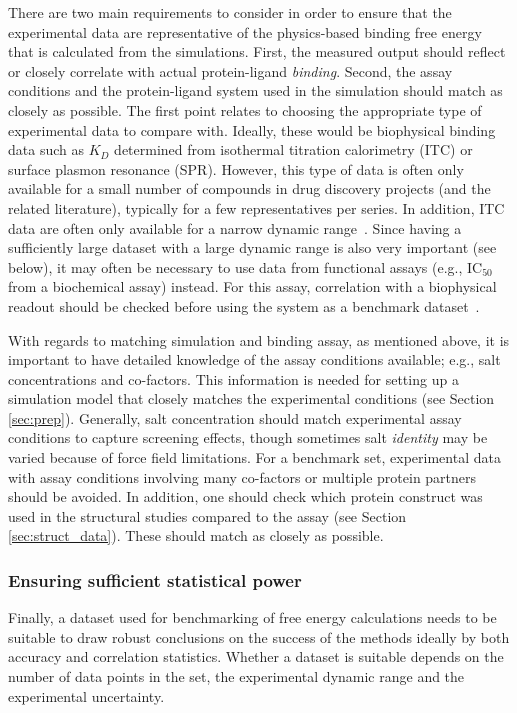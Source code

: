\documentclass[9pt,bestpractices,pubversion]{livecoms}
\begin{document}
There are two main requirements to consider in order to ensure that the experimental data are representative of the physics-based binding free energy that is calculated from the simulations. First, the measured output should reflect or closely correlate with actual protein-ligand \emph{binding}. Second, the assay conditions and the protein-ligand system used in the simulation should match as closely as possible. The first point relates to choosing the appropriate type of experimental data to compare with. Ideally, these would be biophysical binding data such as $K_D$ determined from isothermal titration calorimetry (ITC) or surface plasmon resonance (SPR). However, this type of data is often only available for a small number of compounds in drug discovery projects (and the related literature), typically for a few representatives per series. In addition, ITC data are often only available for a narrow dynamic range~\cite{wiseman_rapid_1989,chodera_entropyenthalpy_2013}. Since having a sufficiently large dataset with a large dynamic range is also very important (see below), it may often be necessary to use data from functional assays (e.g., IC$_{50}$ from a biochemical assay) instead. For this assay, correlation with a biophysical readout should be checked before using the system as a benchmark dataset~\cite{kalliokoski_comparability_2013}.

With regards to matching simulation and binding assay, as mentioned above, it is important to have detailed knowledge of the assay conditions available; e.g., salt concentrations and co-factors. This information is needed for setting up a simulation model that closely matches the experimental conditions (see Section \ref{sec:prep}). Generally, salt concentration should match experimental assay conditions to capture screening effects, though sometimes salt \emph{identity} may be varied because of force field limitations. For a benchmark set, experimental data with assay conditions involving many co-factors or multiple protein partners should be avoided. In addition, one should check which protein construct was used in the structural studies compared to the assay (see Section \ref{sec:struct_data}). These should match as closely as possible. 

\subsubsection{Ensuring sufficient statistical power}
Finally, a dataset used for benchmarking of free energy calculations needs to be suitable to draw robust conclusions on the success of the methods ideally by both accuracy and correlation statistics. Whether a dataset is suitable depends on the number of data points in the set, the experimental dynamic range and the experimental uncertainty. 
\end{document}
